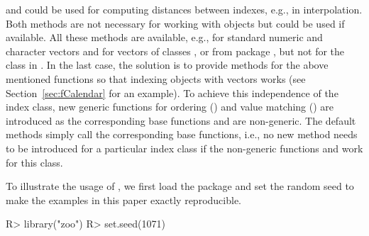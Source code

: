\documentclass[article,nojss]{jss}
\begin{document}
and  could be used for computing distances between indexes, e.g.,
in interpolation. Both methods are not necessary for working with  
objects but could be used if available.
All these methods are available, e.g., for standard numeric and character vectors and for
vectors of classes ,  or 
from package , but not for the class  in .
In the last case, the solution is to provide methods for the above mentioned
functions so that indexing  objects with  vectors works
(see Section~\ref{sec:fCalendar} for an example).
To achieve this  independence of the index class, new generic functions for
ordering () and value matching () are introduced
as the corresponding base functions  and  are 
non-generic. The default methods simply call the corresponding base functions, i.e.,
no new method needs to be introduced for a particular index class if the 
non-generic functions  and  work for this class.

To illustrate the usage of , we first load the package and set the
random seed to make the examples in this paper exactly reproducible.

\begin{Schunk}
\begin{Sinput}
R> library("zoo")
R> set.seed(1071)
\end{Sinput}
\end{Schunk}
\end{document}
